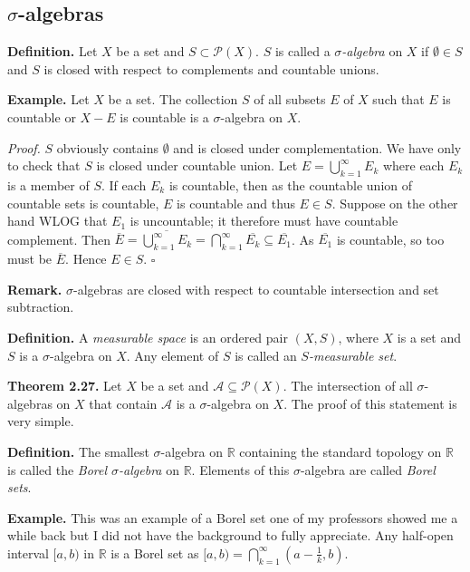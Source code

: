 \documentclass[a4paper]{article}
\newcommand{\R}{\mathbb{R}}
\begin{document}
\subsection{$\sigma$-algebras}

\textbf{Definition.} Let $X$ be a set and $S \subset \mathcal{P}(X)$. $S$ is called a \emph{$\sigma$-algebra} on $X$ if $\emptyset \in S$ and $S$ is closed with respect to complements and countable unions.

\textbf{Example.} Let $X$ be a set. The collection $S$ of all subsets $E$ of $X$ such that $E$ is countable or $X - E$ is countable is a $\sigma$-algebra on $X$.

\emph{Proof.} $S$ obviously contains $\emptyset$ and is closed under complementation. We have only to check that $S$ is closed under countable union. Let $E = \bigcup_{k=1}^\infty E_k$ where each $E_k$ is a member of $S$. If each $E_k$ is countable, then as the countable union of countable sets is countable, $E$ is countable and thus $E \in S$. Suppose on the other hand WLOG that $E_1$ is uncountable; it therefore must have countable complement. Then $\overline{E} = \overline{\bigcup_{k=1}^\infty E_k} = \bigcap_{k=1}^\infty \overline{E_k} \subseteq \overline{E_1}$. As $\overline{E_1}$ is countable, so too must be $\overline{E}$. Hence $E \in S$. $\square$

\textbf{Remark.} $\sigma$-algebras are closed with respect to countable intersection and set subtraction.

\textbf{Definition.} A \emph{measurable space} is an ordered pair $(X, S)$, where $X$ is a set and $S$ is a $\sigma$-algebra on $X$. Any element of $S$ is called an \emph{$S$-measurable set}.

\textbf{Theorem 2.27.} Let $X$ be a set and $\mathcal{A} \subseteq \mathcal{P}(X)$. The intersection of all $\sigma$-algebras on $X$ that contain $\mathcal{A}$ is a $\sigma$-algebra on $X$. The proof of this statement is very simple.

\textbf{Definition.} The smallest $\sigma$-algebra on $\R$ containing the standard topology on $\R$ is called the \emph{Borel $\sigma$-algebra} on $\R$. Elements of this $\sigma$-algebra are called \emph{Borel sets}.

\textbf{Example.} This was an example of a Borel set one of my professors showed me a while back but I did not have the background to fully appreciate. Any half-open interval $[a, b)$ in $\R$ is a Borel set as $[a, b) = \bigcap_{k=1}^\infty \left(a - \frac1k, b\right)$.
\end{document}
